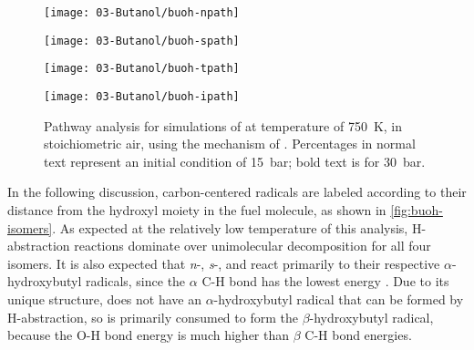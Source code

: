 \documentclass[../main.tex]{subfiles}
\begin{document}
\begin{figure}
    \begin{floatrow}
    \ffigbox
        {\texttt{[image: 03-Butanol/buoh-npath]}}
        {\caption{Pathway analysis for simulations of \nBuOH{} at
            temperature of \SI{750}{\kelvin}, in stoichiometric air, using the mechanism of
            \textcite{Sarathy2012}. Percentages in normal text represent an
            initial condition of \SI{15}{\bar}; bold text is for \SI{30}{\bar}.}
        \label{fig:buoh-npath}}
    \ffigbox
        {\texttt{[image: 03-Butanol/buoh-spath]}}
        {\caption{Pathway analysis for simulations of \sBuOH{} at
            temperature of \SI{750}{\kelvin}, in stoichiometric air, using the mechanism of
            \textcite{Sarathy2012}. Percentages in normal text represent an
            initial condition of \SI{15}{\bar}; bold text is for \SI{30}{\bar}.}
        \label{fig:buoh-spath}}
    \end{floatrow}
    \par
    \begin{floatrow}
    \ffigbox
        {\texttt{[image: 03-Butanol/buoh-tpath]}}
        {\caption{Pathway analysis for simulations of \tBuOH{} at
            temperature of \SI{750}{\kelvin}, in stoichiometric air, using the mechanism of
            \textcite{Sarathy2012}. Percentages in normal text represent an
            initial condition of \SI{15}{\bar}; bold text is for \SI{30}{\bar}.}
        \label{fig:buoh-tpath}}
    \ffigbox
        {\texttt{[image: 03-Butanol/buoh-ipath]}}
        {\caption{Pathway analysis for simulations of \iBuOH{} at
            temperature of \SI{750}{\kelvin}, in stoichiometric air, using the mechanism of
            \textcite{Sarathy2012}. Percentages in normal text represent an
            initial condition of \SI{15}{\bar}; bold text is for \SI{30}{\bar}.}
        \label{fig:buoh-ipath}}
    \end{floatrow}
\end{figure}

In the following discussion, carbon-centered radicals are labeled according to
their distance from the hydroxyl moiety in the fuel molecule, as shown in
\cref{fig:buoh-isomers}. As expected at the relatively low temperature of this analysis, H-abstraction
reactions dominate over unimolecular decomposition for all four isomers. It is
also expected that \textit{n}-, \textit{s}-, and \iBuOH{} react
primarily to their respective $\alpha$-hydroxybutyl radicals, since the
$\alpha$ C-H bond has the lowest energy \cite{Sarathy2012}. Due to its unique
structure, \tBuOH{} does not have an $\alpha$-hydroxybutyl radical
that can be formed by H-abstraction, so \tBuOH{} is primarily
consumed to form the $\beta$-hydroxybutyl radical, because the O-H bond energy
is much higher than $\beta$ C-H bond energies.
\end{document}
